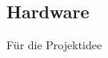 \documentclass[.../Dokumentation.tex]{subfiles}
\begin{document}
    \subsection{Hardware}\label{sec-components-hardware}
    Für die Projektidee 
\end{document}
